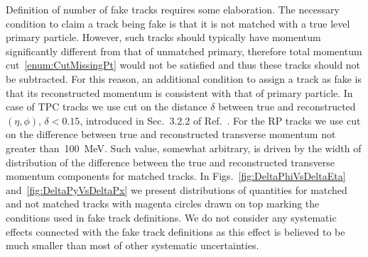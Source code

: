 Definition of number of fake tracks requires some elaboration. The necessary condition to claim a track being fake is that it is not matched with a true level primary particle. However, such tracks should typically have momentum significantly different from that of unmatched primary, therefore total momentum cut~\ref{enum:CutMissingPt} would not be satisfied and thus these tracks should not be subtracted. For this reason, an additional condition to assign a track as fake is that its reconstructed momentum is consistent with that of primary particle. In case of TPC tracks we use cut on the distance $\delta$ between true and reconstructed $(\eta,\phi)$, $\delta < 0.15$, introduced in Sec.~3.2.2 of Ref.~\cite{supplementaryNote}. For the RP tracks we use cut on the difference between true and reconstructed transverse momentum not greater than~100~MeV. Such value, somewhat arbitrary, is driven by the width of distribution of the difference between the true and reconstructed transverse momentum components for matched tracks.  In Figs.~\ref{fig:DeltaPhiVsDeltaEta} and~\ref{fig:DeltaPyVsDeltaPx} we present distributions of quantities for matched and not matched tracks with magenta circles drawn on top marking the conditions used in fake track definitions. We do not consider any systematic effects connected with the fake track definitions as this effect is believed to be much smaller than most of other systematic uncertainties.


